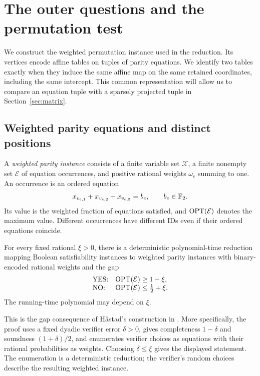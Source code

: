 \section{The outer questions and the permutation test}
\label{sec:game}

We construct the weighted permutation instance used in the reduction.  Its
vertices encode affine tables on tuples of parity equations.  We identify
two tables exactly when they induce the same affine map on the same retained
coordinates, including the same intercept.  This common representation will
allow us to compare an equation tuple with a sparsely projected tuple in
Section~\ref{sec:matrix}.

\subsection{Weighted parity equations and distinct positions}

A \emph{weighted parity instance} consists of a finite variable set
\(\mathcal X\), a finite nonempty set \(\mathcal E\) of equation
occurrences, and positive rational weights \(\omega_e\) summing to one.
An occurrence is an ordered equation
\[
 x_{v_{e,1}}+x_{v_{e,2}}+x_{v_{e,3}}=b_e,
 \qquad b_e\in\mathbb F_2.
\]
Its value is the weighted fraction of equations satisfied, and
\(\operatorname{OPT}(\mathcal E)\) denotes the maximum value.  Different occurrences
have different IDs even if their ordered equations coincide.

\begin{theorem}
\label{thm:parity}
For every fixed rational \(\xi>0\), there is a deterministic
polynomial-time reduction mapping Boolean satisfiability instances to
weighted parity instances with binary-encoded rational weights and the gap
\[
 \begin{array}{ll}
 \textup{YES:}&\operatorname{OPT}(\mathcal E)\ge 1-\xi,\\
 \textup{NO:}&\operatorname{OPT}(\mathcal E)\le \frac12+\xi.
 \end{array}
\]
The running-time polynomial may depend on \(\xi\).
\end{theorem}

This is the gap consequence of H\aa stad's construction in
\cite[Theorem~5.4 and its proof]{Hastad01}.  More specifically, the proof
uses a fixed dyadic verifier error \(\delta>0\), gives completeness
\(1-\delta\) and soundness \((1+\delta)/2\), and enumerates verifier
choices as equations with their rational probabilities as weights.
Choosing \(\delta\le\xi\) gives the displayed statement.  The
enumeration is a deterministic reduction; the verifier's random choices
describe the resulting weighted instance.

